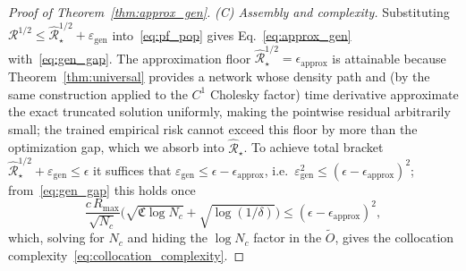\documentclass[twocolumn,aps,prxquantum,superscriptaddress,nofootinbib,floatfix,longbibliography]{revtex4-2}
\begin{document}
\begin{proof}[Proof of Theorem~\ref{thm:approx_gen}]
\emph{(C) Assembly and complexity.} Substituting $\mathcal{R}^{1/2}\le\widehat{\mathcal{R}}_\star^{1/2}+\varepsilon_{\mathrm{gen}}$ into~\eqref{eq:pf_pop} gives Eq.~\eqref{eq:approx_gen} with~\eqref{eq:gen_gap}. The approximation floor $\widehat{\mathcal{R}}_\star^{1/2}=\epsilon_{\mathrm{approx}}$ is attainable because Theorem~\ref{thm:universal} provides a network whose density path and (by the same construction applied to the $C^1$ Cholesky factor) time derivative approximate the exact truncated solution uniformly, making the pointwise residual arbitrarily small; the trained empirical risk cannot exceed this floor by more than the optimization gap, which we absorb into $\widehat{\mathcal{R}}_\star$. To achieve total bracket $\widehat{\mathcal{R}}_\star^{1/2}+\varepsilon_{\mathrm{gen}}\le\epsilon$ it suffices that $\varepsilon_{\mathrm{gen}}\le\epsilon-\epsilon_{\mathrm{approx}}$, i.e.\ $\varepsilon_{\mathrm{gen}}^2\le(\epsilon-\epsilon_{\mathrm{approx}})^2$; from~\eqref{eq:gen_gap} this holds once
\[
\frac{c\,R_{\max}}{\sqrt{N_c}}\big(\sqrt{\mathfrak{C}\log N_c}+\sqrt{\log(1/\delta)}\big)\le(\epsilon-\epsilon_{\mathrm{approx}})^2,
\]
which, solving for $N_c$ and hiding the $\log N_c$ factor in the $\tilde O$, gives the collocation complexity~\eqref{eq:collocation_complexity}.
\end{proof}
\end{document}
